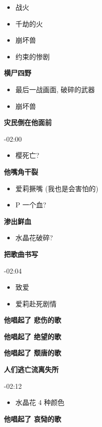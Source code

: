 \documentclass[a4paper]{article}
\begin{document}
\begin{itemize}
    \item 战火
    \item 千劫的火
    \item 崩坏兽
    \item 约束的惨剧
\end{itemize}

\textbf{横尸四野}

\begin{itemize}
    \item 最后一战画面, 破碎的武器
    \item 崩坏兽
\end{itemize}

\textbf{灾民倒在他面前}

-02:00

\begin{itemize}
    \item 樱死亡?
\end{itemize}

\textbf{他嘴角干裂}

\begin{itemize}
    \item 爱莉撅嘴 (我也是会害怕的)
    \item P 一个血?
\end{itemize}

\textbf{渗出鲜血}

\begin{itemize}
    \item 水晶花破碎?
\end{itemize}

\textbf{把歌曲书写}

-02:04

\begin{itemize}
    \item 致爱
    \item 爱莉赴死剧情
\end{itemize}

\textbf{他唱起了 悲伤的歌}

\textbf{他唱起了 绝望的歌}

\textbf{他唱起了 颓唐的歌}

\textbf{人们逃亡流离失所}

-02:12

\begin{itemize}
    \item 水晶花 4 种颜色
\end{itemize}

\textbf{他唱起了 哀恸的歌}
\end{document}
